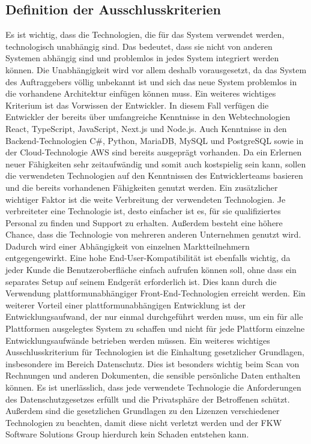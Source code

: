 \subsection{Definition der Ausschlusskriterien}
Es ist wichtig, dass die Technologien, die für das System verwendet werden, technologisch unabhängig sind. Das bedeutet, dass sie nicht von anderen Systemen abhängig sind und problemlos in jedes System integriert werden können. Die Unabhängigkeit wird vor allem deshalb vorausgesetzt, da das System des Auftraggebers völlig unbekannt ist und sich das neue System problemlos in die vorhandene Architektur einfügen können muss.
\newparagraph
Ein weiteres wichtiges Kriterium ist das Vorwissen der Entwickler. In diesem Fall verfügen die Entwickler der \vFKW bereits über umfangreiche Kenntnisse in den Webtechnologien React, TypeScript, JavaScript, Next.js und Node.js. Auch Kenntnisse in den Backend-Technologien C\#, Python, MariaDB, MySQL und PostgreSQL sowie in der Cloud-Technologie \ac{AWS} sind bereits ausgeprägt vorhanden. Da ein Erlernen neuer Fähigkeiten sehr zeitaufwändig und somit auch kostspielig sein kann, sollen die verwendeten Technologien auf den Kenntnissen des Entwicklerteams basieren und die bereits vorhandenen Fähigkeiten genutzt werden.
\newparagraph
Ein zusätzlicher wichtiger Faktor ist die weite Verbreitung der verwendeten Technologien. Je verbreiteter eine Technologie ist, desto einfacher ist es, für sie qualifiziertes Personal zu finden und Support zu erhalten. Außerdem besteht eine höhere Chance, dass die Technologie von mehreren anderen Unternehmen genutzt wird. Dadurch wird einer Abhängigkeit von einzelnen Marktteilnehmern entgegengewirkt.
\newparagraph
Eine hohe End-User-Kompatibilität ist ebenfalls wichtig, da jeder Kunde die Benutzeroberfläche einfach aufrufen können soll, ohne dass ein separates Setup auf seinem Endgerät erforderlich ist. Dies kann durch die Verwendung plattformunabhängiger Front-End-Technologien erreicht werden. Ein weiterer Vorteil einer plattformunabhängigen Entwicklung ist der Entwicklungsaufwand, der nur einmal durchgeführt werden muss, um ein für alle Plattformen ausgelegtes System zu schaffen und nicht für jede Plattform einzelne Entwicklungsaufwände betrieben werden müssen.
\newparagraph
Ein weiteres wichtiges Ausschlusskriterium für Technologien ist die Einhaltung gesetzlicher Grundlagen, insbesondere im Bereich Datenschutz. Dies ist besonders wichtig beim Scan von Rechnungen und anderen Dokumenten, die sensible persönliche Daten enthalten können. Es ist unerlässlich, dass jede verwendete Technologie die Anforderungen des Datenschutzgesetzes erfüllt und die Privatsphäre der Betroffenen schützt. Außerdem sind die gesetzlichen Grundlagen zu den Lizenzen verschiedener Technologien zu beachten, damit diese nicht verletzt werden und der FKW Software Solutions Group hierdurch kein Schaden entstehen kann.
